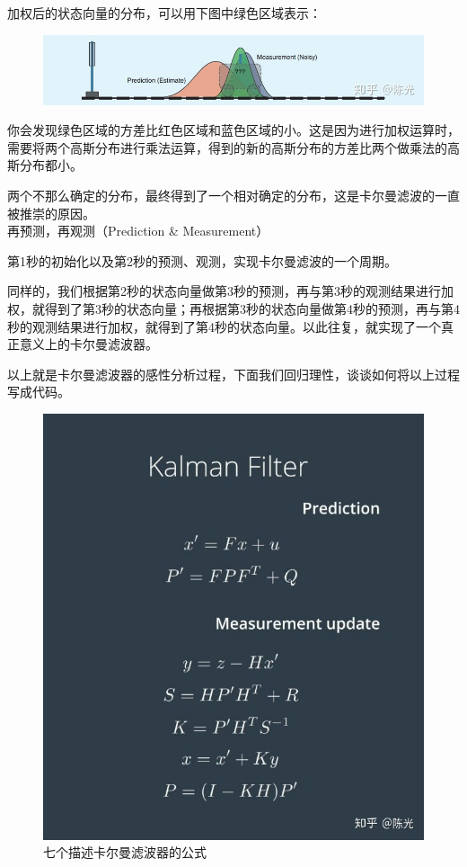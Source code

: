 \documentclass[12pt]{ctexart}
\begin{document}
加权后的状态向量的分布，可以用下图中绿色区域表示：
\begin{figure}[h]
    \centering
    \includegraphics[width = 12cm]{image/15.jpg}
\end{figure}
你会发现绿色区域的方差比红色区域和蓝色区域的小。这是因为进行加权运算时，需要将两个高斯分布进行乘法运算，得到的新的高斯分布的方差比两个做乘法的高斯分布都小。

两个不那么确定的分布，最终得到了一个相对确定的分布，这是卡尔曼滤波的一直被推崇的原因。
~\\
\textcolor{myblue}{再预测，再观测（Prediction \& Measurement）}

第1秒的初始化以及第2秒的预测、观测，实现卡尔曼滤波的一个周期。

同样的，我们根据第2秒的状态向量做第3秒的预测，再与第3秒的观测结果进行加权，就得到了第3秒的状态向量；再根据第3秒的状态向量做第4秒的预测，再与第4秒的观测结果进行加权，就得到了第4秒的状态向量。以此往复，就实现了一个真正意义上的卡尔曼滤波器。

以上就是卡尔曼滤波器的感性分析过程，下面我们回归理性，谈谈如何将以上过程写成代码。
\begin{figure}[p]
    \centering
    \includegraphics[width = 15cm]{image/16.jpg}
    \caption{七个描述卡尔曼滤波器的公式}
\end{figure}
\end{document}
